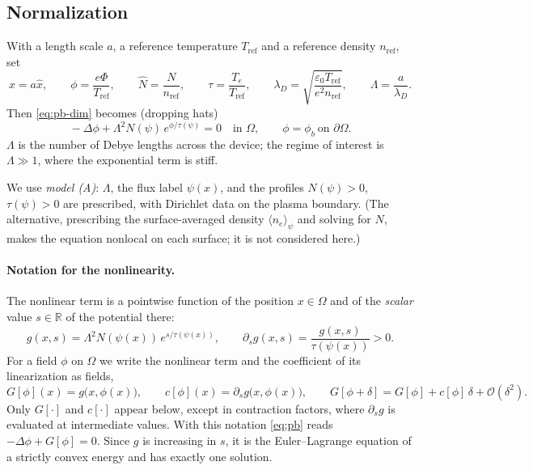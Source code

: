 \documentclass[11pt,a4paper]{article}
\theoremstyle{remark}\newtheorem{remark}{Remark}
\newcommand{\R}{\mathbb{R}}
\begin{document}
\subsection{Normalization}
With a length scale $a$, a reference temperature $T_{\mathrm{ref}}$ and a
reference density $n_{\mathrm{ref}}$, set
\begin{equation}
  x = a\hat x,\qquad \phi=\frac{e\Phi}{T_{\mathrm{ref}}},\qquad
  \hat N=\frac{N}{n_{\mathrm{ref}}},\qquad \tau=\frac{T_e}{T_{\mathrm{ref}}},\qquad
  \lambda_D=\sqrt{\frac{\varepsilon_0T_{\mathrm{ref}}}{e^2n_{\mathrm{ref}}}},\qquad
  \Lambda=\frac{a}{\lambda_D}.
\end{equation}
Then \eqref{eq:pb-dim} becomes (dropping hats)
\begin{equation}\label{eq:pb}
  \boxed{\;-\Delta\phi + \Lambda^2 N(\psi)\,e^{\phi/\tau(\psi)} = 0\quad\text{in }\Omega,
  \qquad \phi=\phi_b\ \text{on }\partial\Omega.\;}
\end{equation}
$\Lambda$ is the number of Debye lengths across the device; the regime of
interest is $\Lambda\gg1$, where the exponential term is stiff.

We use \emph{model (A)}: $\Lambda$, the flux label $\psi(x)$, and the profiles
$N(\psi)>0$, $\tau(\psi)>0$ are prescribed, with Dirichlet data on the plasma
boundary. (The alternative, prescribing the surface-averaged density
$\langle n_e\rangle_\psi$ and solving for $N$, makes the equation nonlocal on
each surface; it is not considered here.)

\paragraph{Notation for the nonlinearity.} The nonlinear term is a pointwise
function of the position $x\in\Omega$ and of the \emph{scalar} value $s\in\R$
of the potential there:
\begin{equation}\label{eq:g}
  g(x,s)=\Lambda^2N(\psi(x))\,e^{s/\tau(\psi(x))},\qquad
  \partial_sg(x,s)=\frac{g(x,s)}{\tau(\psi(x))}>0 .
\end{equation}
For a field $\phi$ on $\Omega$ we write the nonlinear term and the coefficient
of its linearization as fields,
\begin{equation}\label{eq:Gc}
  G[\phi](x)=g\big(x,\phi(x)\big),\qquad c[\phi](x)=\partial_sg\big(x,\phi(x)\big),
  \qquad G[\phi+\delta]=G[\phi]+c[\phi]\,\delta+\mathcal O(\delta^2).
\end{equation}
Only $G[\cdot]$ and $c[\cdot]$ appear below, except in contraction factors,
where $\partial_sg$ is evaluated at intermediate values. With this notation
\eqref{eq:pb} reads $-\Delta\phi+G[\phi]=0$. Since $g$ is increasing in $s$, it
is the Euler--Lagrange equation of a strictly convex energy and has exactly one
solution.
\end{document}
